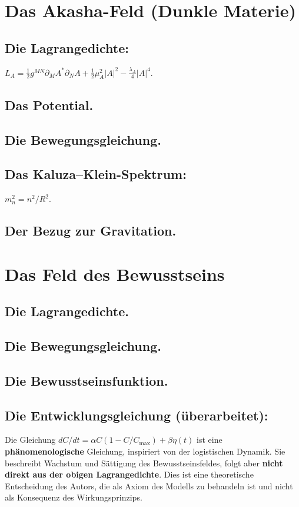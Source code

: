 \documentclass[11pt,a4paper]{article}
\begin{document}
\section{Das Akasha-Feld (Dunkle Materie)}
\subsection{Die Lagrangedichte:} $L_A = \frac{1}{2} g^{MN} \partial_M A^* \partial_N A + \frac{1}{2} \mu_A^2 |A|^2 - \frac{\lambda_A}{4} |A|^4$.
\subsection{Das Potential.}
\subsection{Die Bewegungsgleichung.}
\subsection{Das Kaluza--Klein-Spektrum:} $m_n^2 = n^2/R^2$.
\subsection{Der Bezug zur Gravitation.}

\section{Das Feld des Bewusstseins}
\subsection{Die Lagrangedichte.}
\subsection{Die Bewegungsgleichung.}
\subsection{Die Bewusstseinsfunktion.}
\subsection{Die Entwicklungsgleichung (überarbeitet):} Die Gleichung $dC/dt = \alpha C (1 - C/C_{\text{max}}) + \beta \eta(t)$ ist eine \textbf{phänomenologische} Gleichung, inspiriert von der logistischen Dynamik. Sie beschreibt Wachstum und Sättigung des Bewusstseinsfeldes, folgt aber \textbf{nicht direkt aus der obigen Lagrangedichte}. Dies ist eine theoretische Entscheidung des Autors, die als Axiom des Modells zu behandeln ist und nicht als Konsequenz des Wirkungsprinzips.
\end{document}
